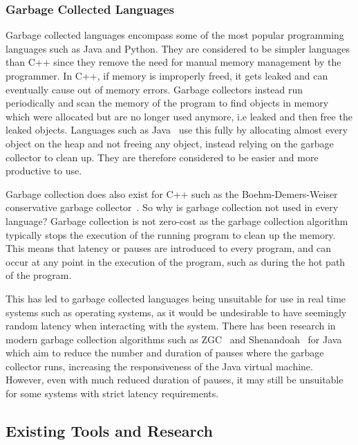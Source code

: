 \documentclass{proposal}
\begin{document}
    \subsubsection{Garbage Collected Languages}

    Garbage collected languages encompass some of the most popular programming languages such as Java and Python.
    They are considered to be simpler languages than C++ since they remove the need for manual memory management by the programmer.
    In C++, if memory is improperly freed, it gets leaked and can eventually cause out of memory errors.
    Garbage collectors instead run periodically and scan the memory of the program to find objects in memory which were allocated but are no longer used anymore, i.e leaked and then free the leaked objects.
    Languages such as Java~\cite{Tauro2012} use this fully by allocating almost every object on the heap and not freeing any object, instead relying on the garbage collector to clean up.
    They are therefore considered to be easier and more productive to use.

    Garbage collection does also exist for C++ such as the Boehm-Demers-Weiser conservative garbage collector~\cite{Boehm2002}.
    So why is garbage collection not used in every language?
    Garbage collection is not zero-cost as the garbage collection algorithm typically stops the execution of the running program to clean up the memory.
    This means that latency or pauses are introduced to every program, and can occur at any point in the execution of the program, such as during the hot path of the program.

    This has led to garbage collected languages being unsuitable for use in real time systems such as operating systems, as it would be undesirable to have seemingly random latency when interacting with the system.
    There has been research in modern garbage collection algorithms such as ZGC~\cite{Liden2018} and Shenandoah~\cite{Flood2016} for Java which aim to reduce the number and duration of pauses where the garbage collector runs, increasing the responsiveness of the Java virtual machine.
    However, even with much reduced duration of pauses, it may still be unsuitable for some systems with strict latency requirements.

    \subsection{Existing Tools and Research}\label{subsec:existing-tools-and-research}
\end{document}
